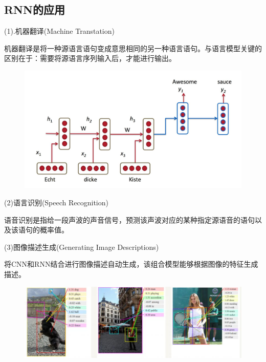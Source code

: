 \documentclass[openbib]{article}
\begin{document}
\subsection{RNN的应用}
\begin{center}
	(1).机器翻译(Machine Transtation)
\end{center}

机器翻译是将一种源语言语句变成意思相同的另一种语言语句。与语言模型关键的区别在于：需要将源语言序列输入后，才能进行输出。

\begin{figure}[htbp]
	\centering
	\includegraphics[scale=0.2]{机器翻译示例}
\end{figure}

\begin{center}
	(2)语言识别(Speech Recognition)
\end{center}

语音识别是指给一段声波的声音信号，预测该声波对应的某种指定源语音的语句以及该语句的概率值。

\begin{center}
	(3)图像描述生成(Generating Image Descriptions)
\end{center}

将CNN和RNN结合进行图像描述自动生成，该组合模型能够根据图像的特征生成描述。

\begin{figure}[htbp]
	\centering
	\includegraphics[scale=0.3]{CNN和RNN结合自动生成图片描述}
\end{figure}
\end{document}
